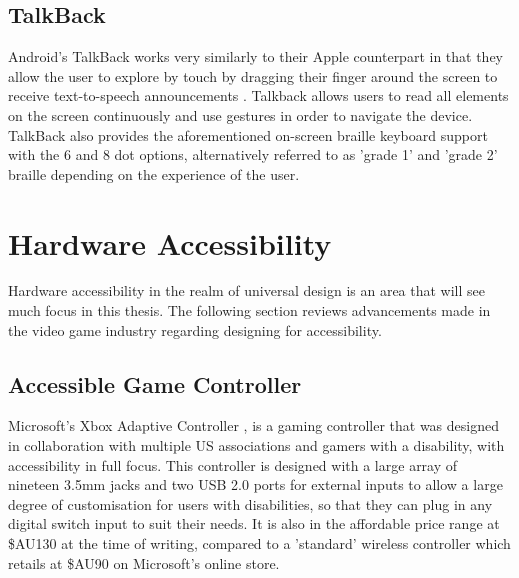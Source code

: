 
\subsection{TalkBack}

Android's TalkBack works very similarly to their Apple counterpart in that they allow the user to explore by touch by dragging their finger around the screen to receive text-to-speech announcements \cite{android}.
Talkback allows users to read all elements on the screen continuously and use gestures in order to navigate the device. %
TalkBack also provides the aforementioned on-screen braille keyboard support with the 6 and 8 dot options, alternatively referred to as 'grade 1' and 'grade 2' braille depending on the experience of the user.

\section{Hardware Accessibility}

Hardware accessibility in the realm of universal design is an area that will see much focus in this thesis. %
The following section reviews advancements made in the video game industry regarding designing for accessibility.

\subsection{Accessible Game Controller}

Microsoft's Xbox Adaptive Controller \cite{adaptive}, is a gaming controller that was designed in collaboration with multiple US associations and gamers with a disability, with accessibility in full focus.
This controller is designed with a large array of nineteen 3.5mm jacks and two USB 2.0 ports for external inputs \cite{adaptive} to allow a large degree of customisation for users with disabilities, so that they can plug in any digital switch input to suit their needs.
It is also in the affordable price range at \$AU130 \cite{accessiblecontroller} at the time of writing, compared to a 'standard' wireless controller which retails at \$AU90 \cite{standardcontroller} on Microsoft's online store.

